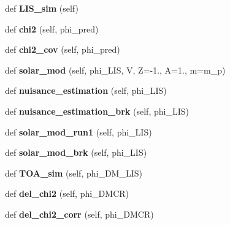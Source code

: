 \begin{DoxyCompactItemize}
\mbox{\label{classDRN__interface_1_1DRNet_aa982e1bda26e633320ce88fb8b2a0fca}} 
def {\bfseries L\+I\+S\+\_\+sim} (self)
\item 
\mbox{\label{classDRN__interface_1_1DRNet_a09dd57f691418fba541bf1edc30d858b}} 
def {\bfseries chi2} (self, phi\+\_\+pred)
\item 
\mbox{\label{classDRN__interface_1_1DRNet_a252b33d12caaab2b991abf37d87833d8}} 
def {\bfseries chi2\+\_\+cov} (self, phi\+\_\+pred)
\item 
\mbox{\label{classDRN__interface_1_1DRNet_adf863a04daea9a3af879ace52e40871f}} 
def {\bfseries solar\+\_\+mod} (self, phi\+\_\+\+L\+IS, V, Z=-\/1., A=1., m=m\+\_\+p)
\item 
\mbox{\label{classDRN__interface_1_1DRNet_a713cb55167cc40e848bcd8b00bfe7113}} 
def {\bfseries nuisance\+\_\+estimation} (self, phi\+\_\+\+L\+IS)
\item 
\mbox{\label{classDRN__interface_1_1DRNet_a96763c6a6446b0f742f61081a6b572d0}} 
def {\bfseries nuisance\+\_\+estimation\+\_\+brk} (self, phi\+\_\+\+L\+IS)
\item 
\mbox{\label{classDRN__interface_1_1DRNet_a25ef94080ba163da2130f9e0d91e7740}} 
def {\bfseries solar\+\_\+mod\+\_\+run1} (self, phi\+\_\+\+L\+IS)
\item 
\mbox{\label{classDRN__interface_1_1DRNet_a966375be0fb74997dd4e1ec39a64103c}} 
def {\bfseries solar\+\_\+mod\+\_\+brk} (self, phi\+\_\+\+L\+IS)
\item 
\mbox{\label{classDRN__interface_1_1DRNet_a239bd6cd2c6ee06cc6a78c6c4b966cad}} 
def {\bfseries T\+O\+A\+\_\+sim} (self, phi\+\_\+\+D\+M\+\_\+\+L\+IS)
\item 
\mbox{\label{classDRN__interface_1_1DRNet_ac1010c8e753514144ccf4ab6a95c240c}} 
def {\bfseries del\+\_\+chi2} (self, phi\+\_\+\+D\+M\+CR)
\item 
\mbox{\label{classDRN__interface_1_1DRNet_a4e203b016ddb9e63ada9eac47a0dfdf2}} 
def {\bfseries del\+\_\+chi2\+\_\+corr} (self, phi\+\_\+\+D\+M\+CR)
\end{DoxyCompactItemize}
